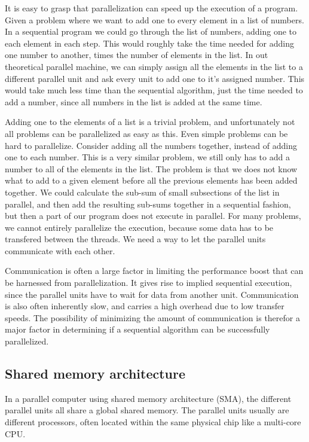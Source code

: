 It is easy to grasp that parallelization can speed up the execution of a program. Given a problem where we want to add one to every element in a list of numbers. In a sequential program we could go through the list of numbers, adding one to each element in each step. This would roughly take the time needed for adding one number to another, times the number of elements in the list. In out theoretical parallel machine, we can simply assign all the elements in the list to a different parallel unit and ask every unit to add one to it's assigned number. This would take much less time than the sequential algorithm, just the time needed to add a number, since all numbers in the list is added at the same time.

Adding one to the elements of a list is a trivial problem, and unfortunately not all problems can be parallelized as easy as this. Even simple problems can be hard to parallelize. Consider adding all the numbers together, instead of adding one to each number. This is a very similar problem, we still only has to add a number to all of the elements in the list. The problem is that we does not know what to add to a given element before all the previous elements has been added together. We could calculate the sub-sum of small subsections of the list in parallel, and then add the resulting sub-sums together in a sequential fashion, but then a part of our program does not execute in parallel. For many problems, we cannot entirely parallelize the execution, because some data has to be transfered between the threads. We need a way to let the parallel units communicate with each other.

Communication is often a large factor in limiting the performance boost that can be harnessed from parallelization. It gives rise to implied sequential execution, since the parallel units have to wait for data from another unit. Communication is also often inherently slow, and carries a high overhead due to low transfer speeds. The possibility of minimizing the amount of communication is therefor a major factor in determining if a sequential algorithm can be successfully parallelized.

\subsection{Shared memory architecture} %
\label{sub:shared_memory_architecture}

In a parallel computer using shared memory architecture (SMA), the different parallel units all share a global shared memory. The parallel units usually are different processors, often located within the same physical chip like a multi-core CPU\@. 

